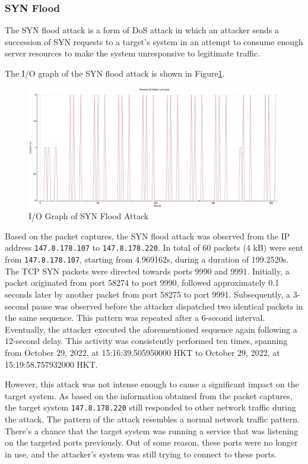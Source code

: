 \documentclass{article}
\begin{document}
    \subsubsection{SYN Flood}\label{subsubsec:syn-flood}
    The SYN flood attack is a form of DoS attack in which an attacker sends a succession of SYN requests to a target's system in an attempt to consume enough server resources to make the system unresponsive to legitimate traffic.

    The I/O graph of the SYN flood attack is shown in Figure\ref{fig:syn-flood-io-graph}.

    \begin{figure}[H]
        \centering
        \includegraphics[width=\textwidth]{image/107_220_syn_tcp.png}
        \caption{I/O Graph of SYN Flood Attack}
        \label{fig:syn-flood-io-graph}
    \end{figure}

    Based on the packet captures, the SYN flood attack was observed from the IP address \lstinline|147.8.178.107| to \lstinline|147.8.178.220|.
    In total of 60 packets (4 kB) were sent from \lstinline|147.8.178.107|, starting from 4.969162s, during a duration of 199.2520s.
    The TCP SYN packets were directed towards ports 9990 and 9991. 
    Initially, a packet originated from port 58274 to port 9990, followed approximately 0.1 seconds later by another packet from port 58275 to port 9991. 
    Subsequently, a 3-second pause was observed before the attacker dispatched two identical packets in the same sequence. 
    This pattern was repeated after a 6-second interval.
    Eventually, the attacker executed the aforementioned sequence again following a 12-second delay.
    This activity was consistently performed ten times, spanning from October 29, 2022, at 15:16:39.505950000 HKT to October 29, 2022, at 15:19:58.757932000 HKT.

    However, this attack was not intense enough to cause a significant impact on the target system.
    As based on the information obtained from the packet captures, the target system \lstinline|147.8.178.220| still responded to other network traffic during the attack.
    The pattern of the attack resembles a normal network traffic pattern. 
    There's a chance that the target system was running a service that was listening on the targeted ports previously.
    Out of some reason, these ports were no longer in use, and the attacker's system was still trying to connect to these ports.
\end{document}
